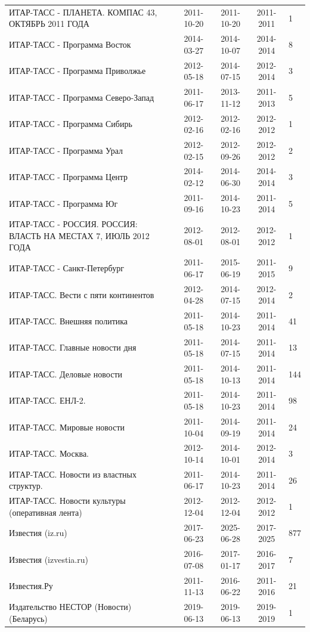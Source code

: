 \begin{longtable}{p{6cm}cccp{2cm}}
ИТАР-ТАСС - ПЛАНЕТА. КОМПАС 43, ОКТЯБРЬ 2011 ГОДА & 2011-10-20 & 2011-10-20 & 2011-2011 & 1\\
ИТАР-ТАСС - Программа Восток & 2014-03-27 & 2014-10-07 & 2014-2014 & 8\\
ИТАР-ТАСС - Программа Приволжье & 2012-05-18 & 2014-07-15 & 2012-2014 & 3\\
ИТАР-ТАСС - Программа Северо-Запад & 2011-06-17 & 2013-11-12 & 2011-2013 & 5\\
ИТАР-ТАСС - Программа Сибирь & 2012-02-16 & 2012-02-16 & 2012-2012 & 1\\
ИТАР-ТАСС - Программа Урал & 2012-02-15 & 2012-09-26 & 2012-2012 & 2\\
ИТАР-ТАСС - Программа Центр & 2014-02-12 & 2014-06-30 & 2014-2014 & 3\\
ИТАР-ТАСС - Программа Юг & 2011-09-16 & 2014-10-23 & 2011-2014 & 5\\
ИТАР-ТАСС - РОССИЯ. РОССИЯ: ВЛАСТЬ НА МЕСТАХ 7, ИЮЛЬ 2012 ГОДА & 2012-08-01 & 2012-08-01 & 2012-2012 & 1\\
ИТАР-ТАСС - Санкт-Петербург & 2011-06-17 & 2015-06-19 & 2011-2015 & 9\\
ИТАР-ТАСС. Вести с пяти континентов & 2012-04-28 & 2014-07-15 & 2012-2014 & 2\\
ИТАР-ТАСС. Внешняя политика & 2011-05-18 & 2014-10-23 & 2011-2014 & 41\\
ИТАР-ТАСС. Главные новости дня & 2011-05-18 & 2014-07-15 & 2011-2014 & 13\\
ИТАР-ТАСС. Деловые новости & 2011-05-18 & 2014-10-13 & 2011-2014 & 144\\
ИТАР-ТАСС. ЕНЛ-2. & 2011-05-18 & 2014-10-23 & 2011-2014 & 98\\
ИТАР-ТАСС. Мировые новости & 2011-10-04 & 2014-09-19 & 2011-2014 & 24\\
ИТАР-ТАСС. Москва. & 2012-10-14 & 2014-10-01 & 2012-2014 & 3\\
ИТАР-ТАСС. Новости из властных структур. & 2011-06-17 & 2014-10-23 & 2011-2014 & 26\\
ИТАР-ТАСС. Новости культуры (оперативная лента) & 2012-12-04 & 2012-12-04 & 2012-2012 & 1\\
Известия (iz.ru) & 2017-06-23 & 2025-06-28 & 2017-2025 & 877\\
Известия (izvestia.ru) & 2016-07-08 & 2017-01-17 & 2016-2017 & 7\\
Известия.Ру & 2011-11-13 & 2016-06-22 & 2011-2016 & 21\\
Издательство НЕСТОР (Новости) (Беларусь) & 2019-06-13 & 2019-06-13 & 2019-2019 & 1\\

\end{longtable}
